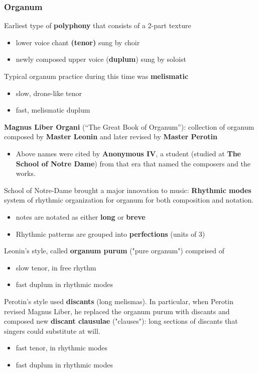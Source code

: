 \documentclass{article}
\begin{document}
  \subsubsection{Organum}
  Earliest type of \textbf{polyphony} that consists of a 2-part texture
  \begin{itemize}
    \item lower voice chant \textbf{(tenor)} sung by choir
    \item newly composed upper voice (\textbf{duplum}) sung by soloist
  \end{itemize}
  Typical organum practice during this time was \textbf{melismatic}
  \begin{itemize}
    \item slow, drone-like tenor
    \item fast, melismatic duplum
  \end{itemize}
  \textbf{Magnus Liber Organi} (“The Great Book of Organum”): collection of organum composed by \textbf{Master Leonin} and later revised by \textbf{Master Perotin}
  \begin{itemize}
    \item Above names were cited by \textbf{Anonymous IV}, a student (studied at \textbf{The School of Notre Dame}) from that era that named the composers and the works.
  \end{itemize}
  School of Notre-Dame brought a major innovation to music: \textbf{Rhythmic modes} system of rhythmic organization for organum for both composition and notation.
  \begin{itemize}
    \item notes are notated as either \textbf{long} or \textbf{breve}
    \item Rhythmic patterns are grouped into \textbf{perfections} (units of 3)
  \end{itemize}
  Leonin's style, called \textbf{organum purum} ("pure organum") comprised of
  \begin{itemize}
    \item slow tenor, in free rhythm
    \item fast duplum in rhythmic modes
  \end{itemize}
  Perotin's style used \textbf{discants} (long melismas). In particular, when Perotin revised Magnus Liber, he replaced the organum purum with discants and composed new \textbf{discant clausulae} ("clauses"): long sections of discants that singers could substitute at will.
  \begin{itemize}
    \item fast tenor, in rhythmic modes
    \item fast duplum in rhythmic modes
  \end{itemize}
\end{document}
